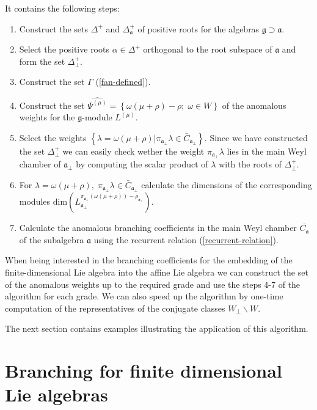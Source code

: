 \documentclass[12pt]{iopart}
\theoremstyle{definition}
\theoremstyle{definition}
\theoremstyle{definition}
\begin{document}
It contains the following steps:
\begin{enumerate}
\item Construct the sets $\Delta^{+}$ and $\Delta_{\mathfrak{a}}^{+}$ of positive roots for the algebras $\mathfrak{g} \supset \mathfrak{a}$.
\item Select the positive roots $\alpha\in \Delta^{+}$ orthogonal to the root subspace of $\mathfrak{a}$ and form the set $\Delta^{+}_{\bot}$.
\item Construct the set $\Gamma$ (\ref{fan-defined}).
\item Construct the set $\widehat{\Psi^{(\mu)}}=\left\{\omega(\mu+\rho)-\rho;\; \omega\in W\right\}$ of the anomalous weights for the $\mathfrak{g}$-module $L^{(\mu)}$.
\item Select the weights $\left\{ \lambda=\omega(\mu+\rho) | \pi_{\mathfrak{a}_{\bot}}\lambda \in \bar{C}_{\mathfrak{a}_{\bot}} \right\}$.
Since we have constructed the set $\Delta^{+}_{\bot}$ we can easily check wether the weight $\pi_{\mathfrak{a}_{\bot}}\lambda$ lies
in the main Weyl chamber of $\mathfrak{a}_{\bot}$ by computing the scalar product of $\lambda$ with the roots of $\Delta^{+}_{\bot}$.
\item For $\lambda=\omega(\mu+\rho),\; \pi_{\mathfrak{a}_{\bot}}\lambda\in \bar{C}_{\mathfrak{a}_{\bot}}$ calculate
the dimensions of the corresponding modules $\mathrm{dim}\left(L^{\pi_{\mathfrak{a}_{\bot}}(\omega(\mu+\rho))
-\rho_{\mathfrak{a}_{\bot}}}_{\mathfrak{a}_{\bot}}\right)$.
\item Calculate the anomalous branching coefficients in the main Weyl
  chamber $\bar{C_{\mathfrak{a}}}$ of the subalgebra $\mathfrak{a}$ using the recurrent relation (\ref{recurrent-relation}).
\end{enumerate}

When being interested in the branching coefficients for the embedding of the finite-dimensional Lie algebra into the affine Lie algebra we can construct the set of the anomalous weights up to the required grade and use the steps 4-7 of the algorithm for each grade. We can also speed up the algorithm by one-time computation of the representatives of the conjugate classes $W_{\bot}\backslash W$.

The next section contains examples illustrating the application of this algorithm.

\section{Branching for finite dimensional Lie algebras}
\label{sec:finite-dimens-lie}
\end{document}
